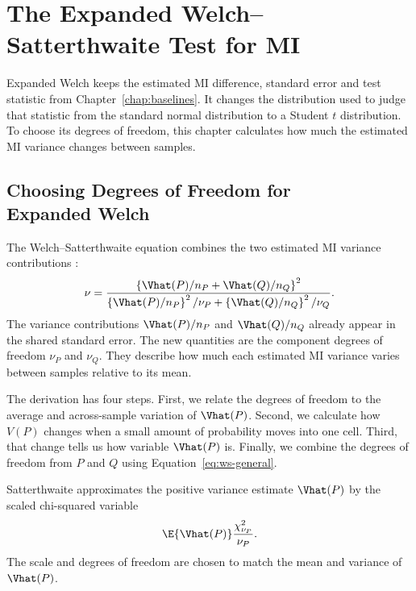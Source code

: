 \chapter{The Expanded Welch--Satterthwaite Test for MI}
\label{chap:expanded}

Expanded Welch keeps the estimated MI difference, standard error and test
statistic from Chapter~\ref{chap:baselines}. It changes the distribution used
to judge that statistic from the standard normal distribution to a Student
\(t\) distribution. To choose its degrees of freedom, this chapter calculates
how much the estimated MI variance changes between samples.

\section[Choosing Degrees of Freedom for Expanded Welch]{Choosing Degrees of
Freedom for\\Expanded Welch}

The Welch--Satterthwaite equation combines the two estimated MI variance
contributions
\citep{satterthwaite1946,welch1947}:
\begin{equation}
  \nu
  =
  \frac{
  \left\{\Vhat(P)/n_P+\Vhat(Q)/n_Q\right\}^2
  }{
  \left\{\Vhat(P)/n_P\right\}^2/\nu_P
  +\left\{\Vhat(Q)/n_Q\right\}^2/\nu_Q
  }.
  \label{eq:ws-general}
\end{equation}
The variance contributions \(\Vhat(P)/n_P\) and \(\Vhat(Q)/n_Q\) already
appear in the shared standard error. The new quantities are the component
degrees of freedom \(\nu_P\) and \(\nu_Q\). They describe how much each
estimated MI variance varies between samples relative to its mean.

The derivation has four steps. First, we relate the degrees of freedom to the
average and across-sample variation of \(\Vhat(P)\). Second, we calculate how \(V(P)\)
changes when a small amount of probability moves into one cell. Third, that
change tells us how variable \(\Vhat(P)\) is. Finally, we combine the
degrees of freedom from \(P\) and \(Q\) using Equation~\eqref{eq:ws-general}.

\medskip
{}

Satterthwaite approximates the positive variance estimate \(\Vhat(P)\) by
the scaled chi-squared variable
\begin{equation}
  \E\{\Vhat(P)\}
  \frac{\chi^2_{\nu_P}}{\nu_P}.
  \label{eq:scaled-chi-working}
\end{equation}
The scale and degrees of freedom are chosen to match the mean and variance
of \(\Vhat(P)\).

